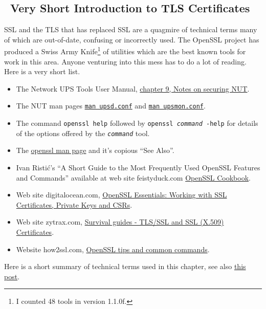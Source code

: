 \documentclass[12pt]{article}
\newlength{\headersep}\setlength{\headersep}{3mm}
\newcommand{\Hsep}{\hspace{\headersep}}
\newcommand{\NUTman}[1]{\href{http://networkupstools.org/docs/man/#1.html}{\texttt{man #1}}}
\newcommand{\ul}{\begin{itemize}%
   \setlength{\itemsep}{0em}}
\newcommand{\eul}{\end{itemize}}
\newcommand{\li}{\item}                 %
\begin{document}
\subsection{\Hsep\ Very Short Introduction to TLS Certificates}\label{section:TLS.intro}

SSL and the TLS that has replaced SSL are a quagmire of technical terms many
of which are out-of-date, confusing or incorrectly used.  The OpenSSL project
has produced a Swiss Army Knife\footnote{I counted 48 tools in version
  1.1.0f.} of utilities which are the best known tools for work in this area.
Anyone venturing into this mess has to do a lot of reading.  Here is a very
short list.

\ul

\li The Network UPS Tools User Manual,
  \href{https://networkupstools.org/docs/user-manual.chunked/ar01s09.html}%
       {chapter 9, Notes on securing NUT}.

\li The NUT man pages \NUTman{upsd.conf} and \NUTman{upsmon.conf}.

\li The command \texttt{openssl help} followed by \texttt{openssl
  \textsl{command} -help} for details of the options offered by the
\texttt{\textsl{command}} tool.

\li The \href{https://linux.die.net/man/1/openssl}%
             {openssl man page} and it's copious ``See Also''. 
       
\li Ivan Risti\'{c}'s ``A Short Guide to the Most Frequently Used OpenSSL
Features and Commands'' available at web site feistyduck.com
\href{https://www.feistyduck.com/library/openssl-cookbook/online/}%
     {OpenSSL Cookbook}.

\li Web site digitalocean.com,
     \href{https://www.digitalocean.com/community/tutorials/openssl-essentials-working-with-ssl-certificates-private-keys-and-csrs}%
     {OpenSSL Essentials: Working with SSL Certificates, Private Keys and CSRs}.

\li Web site zytrax.com, 
  \href{http://www.zytrax.com/tech/survival/ssl.html}%
       {Survival guides - TLS/SSL and SSL (X.509) Certificates}.

\li Website how2ssl.com, 
\href{http://how2ssl.com/articles/openssl\_commands\_and\_tips/}%
     {OpenSSL tips and common commands}.

\eul
       
Here is a short summary of technical terms used in this chapter, see also
\href{https://serverfault.com/questions/9708/what-is-a-pem-file-and-how-does-it-differ-from-other-openssl-generated-key-file}%
     {this post}.
\end{document}
